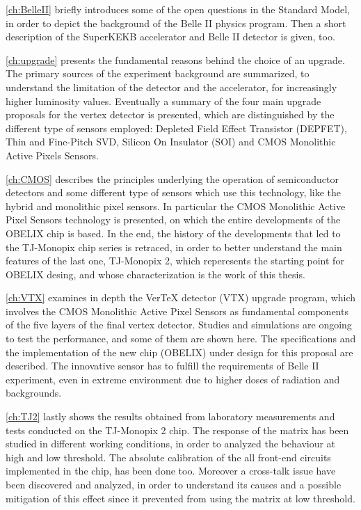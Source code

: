 \autoref{ch:BelleII} briefly introduces some of the open questions in the Standard Model, in order to depict the background of the Belle II physics program. Then a short description of the SuperKEKB accelerator and Belle II detector is given, too. 

\autoref{ch:upgrade} presents the fundamental reasons behind the choice of an upgrade. The primary sources of the experiment background are summarized, to understand the limitation of the detector and the accelerator, for increasingly higher luminosity values. Eventually a summary of the four main upgrade proposals for the vertex detector is presented, which are distinguished by the different type of sensors employed: Depleted Field Effect Transistor (DEPFET), Thin and Fine-Pitch SVD, Silicon On Insulator (SOI) and CMOS Monolithic Active Pixels Sensors.

\autoref{ch:CMOS} describes the principles underlying the operation of semiconductor detectors and some different type of sensors which use this technology, like the hybrid and monolithic pixel sensors. In particular the CMOS Monolithic Active Pixel Sensors technology is presented, on which the entire developments of the OBELIX chip is based. In the end, the history of the developments that led to the TJ-Monopix chip series is retraced, in order to better understand the main features of the last one, TJ-Monopix 2, which reperesents the starting point for OBELIX desing, and whose characterization is the work of this thesis.

\autoref{ch:VTX} examines in depth the VerTeX detector (VTX) upgrade program, which involves the CMOS Monolithic Active Pixel Sensors as fundamental components of the five layers of the final vertex detector. Studies and simulations are ongoing to test the performance, and some of them are shown here. The specifications and the implementation of the new chip (OBELIX) under design for this proposal are described. The innovative sensor has to fulfill the requirements of Belle II experiment, even in extreme environment due to higher doses of radiation and backgrounds.


\autoref{ch:TJ2} lastly shows the results obtained from laboratory measurements and tests conducted on the TJ-Monopix 2 chip. The response of the matrix has been studied in different working conditions, in order to analyzed the behaviour at high and low threshold. The absolute calibration of the all front-end circuits implemented in the chip, has been done too.
Moreover a cross-talk issue have been discovered and analyzed, in order to understand its causes and a possible mitigation of this effect since it prevented from using the matrix at low threshold.
